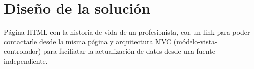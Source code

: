 \section{Diseño de la solución}

Página HTML con la historia de vida de un profesionista, con un link para poder contactarle desde la misma página y arquitectura MVC (módelo-vista-controlador) para faciliatar la actualización de datos desde una fuente independiente.



